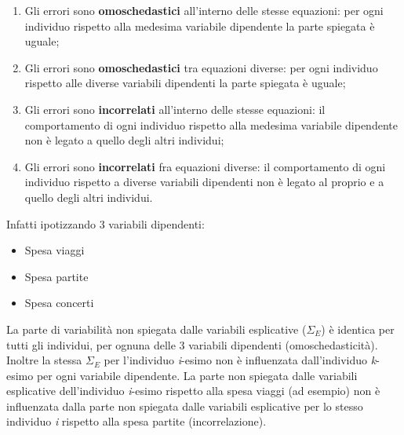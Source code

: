 \documentclass[a4page, 11pt]{article} %
\begin{document}
\begin{enumerate}[noitemsep]
\item Gli errori sono \textbf{omoschedastici} all’interno delle stesse equazioni: per ogni individuo rispetto alla medesima variabile dipendente la parte spiegata è uguale;
\item Gli errori sono \textbf{omoschedastici} tra equazioni diverse: per ogni individuo rispetto alle diverse variabili dipendenti la parte spiegata è uguale;
\item Gli errori sono \textbf{incorrelati} all’interno delle stesse equazioni: il comportamento di ogni individuo rispetto alla medesima variabile dipendente non è legato a quello degli altri individui;
\item Gli errori sono \textbf{incorrelati} fra equazioni diverse: il comportamento di ogni individuo rispetto a diverse variabili dipendenti non è legato al proprio e a quello degli altri individui.
\end{enumerate}
Infatti ipotizzando 3 variabili dipendenti:
\begin{itemize}[noitemsep]
\item Spesa viaggi
\item Spesa partite
\item Spesa concerti
\end{itemize}
La parte di variabilità non spiegata dalle variabili esplicative ($\Sigma_{E}$) è identica per tutti gli individui, per ognuna delle 3  variabili dipendenti (omoschedasticità). Inoltre la stessa $\Sigma_E$ per l’individuo \textit{i}-esimo non è influenzata dall’individuo \textit{k}-esimo per ogni variabile dipendente. La parte non spiegata dalle variabili esplicative dell’individuo \textit{i}-esimo rispetto alla spesa viaggi (ad esempio) non è influenzata dalla parte non spiegata dalle variabili esplicative per lo stesso individuo \textit{i} rispetto alla spesa partite (incorrelazione).
\end{document}
